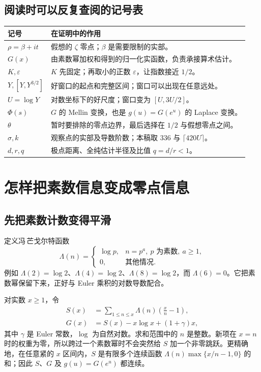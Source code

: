 \documentclass[UTF8,fontset=fandol,a4paper,openany,oneside]{ctexbook}
\theoremstyle{definition}
\theoremstyle{remark}
\begin{document}
\section{阅读时可以反复查阅的记号表}
\begin{longtable}{@{}p{}p{}@{}}
\toprule
记号 & 在证明中的作用\\
\midrule
\endhead
$\rho=\beta+it$ & 假想的 $\zeta$ 零点；$\beta$ 是需要限制的实部。\\
$G(x)$ & 由素数幂加权和得到的归一化实函数，负责承接算术估计。\\
$K,\varepsilon$ & $K$ 先固定；再取小的正数 $\varepsilon$，让指数接近 $1/2$。\\
$Y,[Y,Y^{3/2}]$ & 好窗口的起点和完整区间；窗口可以出现在任意远处。\\
$U=\log Y$ & 对数坐标下的好尺度；窗口变为 $[U,3U/2]$。\\
$\Phi(s)$ & $G$ 的 Mellin 变换，也是 $g(u)=G(e^u)$ 的 Laplace 变换。\\
$\theta$ & 暂时要排除的零点边界，最后选择在 $1/2$ 与假想零点之间。\\
$\sigma,k$ & 观察点的实部及导数阶数；本稿取 $336$ 与 $\lceil420U\rceil$。\\
$d,r,q$ & 极点距离、全纯估计半径及比值 $q=d/r<1$。\\
\bottomrule
\end{longtable}



\chapter{怎样把素数信息变成零点信息}
\label{chap:bridge}
\section{先把素数计数变得平滑}
定义冯\,芒戈尔特函数
\[
\Lambda(n)=
\begin{cases}
\log p,&n=p^a,\ p\text{ 为素数},\ a\ge1,\\
0,&\text{其他情况}.
\end{cases}
\]
例如 $\Lambda(2)=\log2$、$\Lambda(4)=\log2$、$\Lambda(8)=\log2$，而 $\Lambda(6)=0$。它把素数幂保留下来，正好与 Euler 乘积的对数导数配合。

对实数 $x\ge1$，令
\begin{align}
S(x)&=\sum_{1\le n\le x}\Lambda(n)\left(\frac{x}{n}-1\right),\label{eq:S}\\
G(x)&=S(x)-x\log x+(1+\gamma)x,\label{eq:G}
\end{align}
其中 $\gamma$ 是 Euler 常数，$\log$ 为自然对数。求和范围中的 $n$ 是整数。新项在 $x=n$ 时的权重为零，所以跨过一个素数幂时不会突然给 $S$ 加一个非零跳跃。更精确地，在任意紧的 $x$ 区间内，$S$ 是有限多个连续函数 $\Lambda(n)\max\{x/n-1,0\}$ 的和；因此 $S$、$G$ 及 $g(u)=G(e^u)$ 都连续。
\end{document}
